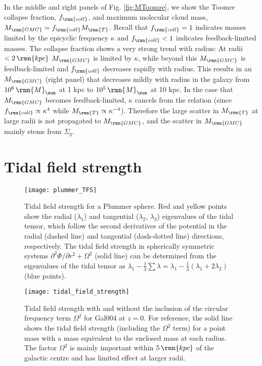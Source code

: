 \documentclass[fleqn,usenatbib]{mnras}
\newcommand\Msun{\,\rmn{M}_{\sun}}
\newcommand\kpc{\,\rmn{kpc}}
\newcommand{\Mtoomre}{M_\rmn{T}}
\newcommand{\Mgmc}{M_\rmn{GMC}}
\begin{document}
In the middle and right panels of Fig. \ref{fig:MToomre}, we show the Toomre collapse fraction, $f_\rmn{coll}$, and maximum molecular cloud mass, $\Mgmc = f_\rmn{coll} \Mtoomre$. Recall that $f_\rmn{coll} = 1$ indicates masses limited by the epicyclic frequency $\kappa$ and $f_\rmn{coll} < 1$ indicates feedback-limited masses.
The collapse fraction shows a very strong trend with radius: At radii $<2\kpc$ $\Mgmc$ is limited by $\kappa$, while beyond this $\Mgmc$ is feedback-limited and $f_\rmn{coll}$ decreases rapidly with radius. 
This results in an $\Mgmc$ (right panel) that decreases mildly with radius in the galaxy from $10^6 \Msun$ at 1 kpc to $10^5 \Msun$ at 10 kpc.
In the case that $\Mgmc$ becomes feedback-limited, $\kappa$ cancels from the relation (since $f_\rmn{coll} \propto \kappa^4$ while $\Mtoomre \propto \kappa^{-4}$). Therefore the large scatter in $\Mtoomre$ at large radii is not propagated to $\Mgmc$, and the scatter in $\Mgmc$ mainly stems from $\Sigma_g$.


\section{Tidal field strength} \label{app:tidal_field}

\begin{figure}
  \texttt{[image: plummer\_TFS]}
  \caption{ Tidal field strength for a Plummer sphere. Red and yellow points show the radial ($\lambda_1$) and tangential ($\lambda_2$, $\lambda_3$) eigenvalues of the tidal tensor, which follow the second derivatives of the potential in the radial (dashed line) and tangential (dash-dotted line) directions, respectively. The tidal field strength in spherically symmetric systems $\partial^2\Phi/\partial r^2 + \Omega^2$ (solid line) can be determined from the eigenvalues of the tidal tensor as $\lambda_1 - \frac{1}{3}\sum\lambda = \lambda_1 - \frac{1}{3}(\lambda_1 + 2 \lambda_2)$ (blue points).}
  \label{fig:plummer_TFS}
\end{figure}

\begin{figure}
  \texttt{[image: tidal\_field\_strength]}
  \caption{Tidal field strength with and without the inclusion of the circular frequency term $\Omega^2$ for Gal004 at $z=0$. For reference, the solid line shows the tidal field strength (including the $\Omega^2$ term) for a point mass with a mass equivalent to the enclosed mass at each radius. The factor $\Omega^2$ is mainly important within $5 \kpc$ of the galactic centre and has limited effect at larger radii.}
  \label{fig:tidal_field}
\end{figure}
\end{document}
